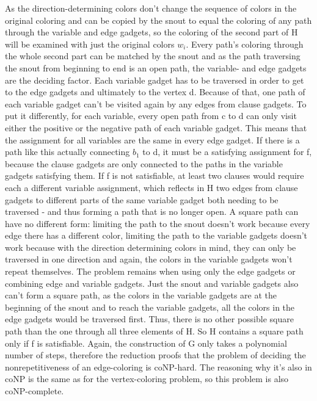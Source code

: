 \documentclass[12pt,a4paper]{article}
\begin{document}
As the direction-determining colors don't change the sequence of colors in the original coloring and can be copied by the snout to equal the coloring of any path through the variable and edge gadgets, so the coloring of the second part of H will be examined with just the original colors $w_i$. Every path's coloring through the whole second part can be matched by the snout and as the path traversing the snout from beginning to end is an open path, the variable- and edge gadgets are the deciding factor. Each variable gadget has to be traversed in order to get to the edge gadgets and ultimately to the vertex d. Because of that, one path of each variable gadget can't be visited again by any edges from clause gadgets. To put it differently, for each variable, every open path from c to d can only visit either the positive or the negative path of each variable gadget. This means that the assignment for all variables are the same in every edge gadget. If there is a path like this actually connecting $b_1$ to d, it must be a satisfying assignment for f, because the clause gadgets are only connected to the paths in the variable gadgets satisfying them. If f is not satisfiable, at least two clauses would require each a different variable assignment, which reflects in H two edges from clause gadgets to different parts of the same variable gadget both needing to be traversed - and thus forming a path that is no longer open. A square path can have no different form: limiting the path to the snout doesn't work because every edge there has a different color, limiting the path to the variable gadgets doesn't work because with the direction determining colors in mind, they can only be traversed in one direction and again, the colors in the variable gadgets won't repeat themselves. The problem remains when using only the edge gadgets or combining edge and variable gadgets. Just the snout and variable gadgets also can't form a square path, as the colors in the variable gadgets are at the beginning of the snout and to reach the variable gadgets, all the colors in the edge gadgets would be traversed first. Thus, there is no other possible square path than the one through all three elements of H. So H contains a square path only if f is satisfiable.
\newline
Again, the construction of G only takes a polynomial number of steps, therefore the reduction proofs that the problem of deciding the nonrepetitiveness of an edge-coloring is coNP-hard. The reasoning why it's also in coNP is the same as for the vertex-coloring problem, so this problem is also coNP-complete.
\end{document}
